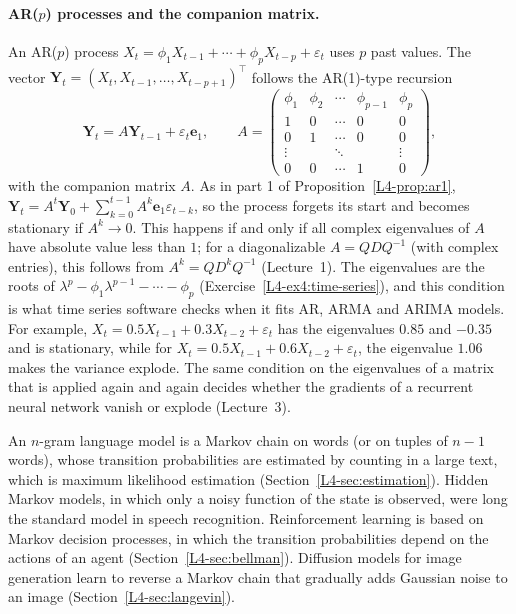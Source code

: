 \paragraph{AR($p$) processes and the companion matrix.} An AR($p$) process $X_t = \phi_1X_{t-1} + \cdots + \phi_pX_{t-p} + \varepsilon_t$ uses $p$ past values. The vector $\mathbf{Y}_t = (X_t, X_{t-1}, \ldots, X_{t-p+1})^\top$ follows the AR(1)-type recursion
\[\mathbf{Y}_t = A\mathbf{Y}_{t-1} + \varepsilon_t\mathbf{e}_1, \qquad A = \begin{pmatrix} \phi_1 & \phi_2 & \cdots & \phi_{p-1} & \phi_p \\ 1 & 0 & \cdots & 0 & 0 \\ 0 & 1 & \cdots & 0 & 0 \\ \vdots & & \ddots & & \vdots \\ 0 & 0 & \cdots & 1 & 0 \end{pmatrix},\]
with the companion matrix $A$. As in part 1 of Proposition~\ref{L4-prop:ar1}, $\mathbf{Y}_t = A^t\mathbf{Y}_0 + \sum_{k=0}^{t-1}A^k\mathbf{e}_1\varepsilon_{t-k}$, so the process forgets its start and becomes stationary if $A^k \to 0$. This happens if and only if all complex eigenvalues of $A$ have absolute value less than $1$; for a diagonalizable $A = QDQ^{-1}$ (with complex entries), this follows from $A^k = QD^kQ^{-1}$ (Lecture~1). The eigenvalues are the roots of $\lambda^p - \phi_1\lambda^{p-1} - \cdots - \phi_p$ (Exercise~\ref{L4-ex4:time-series}), and this condition is what time series software checks when it fits AR, ARMA and ARIMA models. For example, $X_t = 0.5X_{t-1} + 0.3X_{t-2} + \varepsilon_t$ has the eigenvalues $0.85$ and $-0.35$ and is stationary, while for $X_t = 0.5X_{t-1} + 0.6X_{t-2} + \varepsilon_t$, the eigenvalue $1.06$ makes the variance explode. The same condition on the eigenvalues of a matrix that is applied again and again decides whether the gradients of a recurrent neural network vanish or explode (Lecture~3).

\begin{remark}
    An $n$-gram language model is a Markov chain on words (or on tuples of $n - 1$ words), whose transition probabilities are estimated by counting in a large text, which is maximum likelihood estimation (Section~\ref{L4-sec:estimation}). Hidden Markov models, in which only a noisy function of the state is observed, were long the standard model in speech recognition. Reinforcement learning is based on Markov decision processes, in which the transition probabilities depend on the actions of an agent (Section~\ref{L4-sec:bellman}). Diffusion models for image generation learn to reverse a Markov chain that gradually adds Gaussian noise to an image (Section~\ref{L4-sec:langevin}).
\end{remark}


